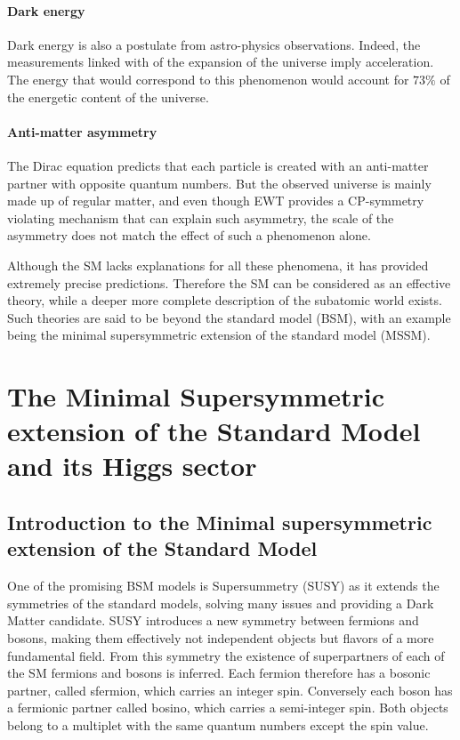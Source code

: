 \paragraph{Dark energy} Dark energy is also a postulate from astro-physics observations. Indeed, the measurements linked with of the expansion of the universe imply acceleration. The energy that would correspond to this phenomenon would account for $73\%$ of the energetic content of the universe. 

\paragraph{Anti-matter asymmetry} The Dirac equation predicts that each particle is created with an anti-matter partner with opposite quantum numbers. But the observed universe is mainly made up of regular matter, and even though EWT provides a CP-symmetry violating mechanism that can explain such asymmetry, the scale of the asymmetry does not match the effect of such a phenomenon alone.\newline

Although the SM lacks explanations for all these phenomena, it has provided extremely precise predictions. Therefore the SM can be considered as an effective theory, while a deeper more complete description of the subatomic world exists. Such theories are said to be beyond the standard model (BSM), with an example being the minimal supersymmetric extension of the standard model (MSSM).


\section{The Minimal Supersymmetric extension of the Standard Model and its Higgs sector}
\label{sec:MSSM}

\subsection{Introduction to the Minimal supersymmetric extension of the Standard Model}

One of the promising BSM models is Supersummetry (SUSY) as it extends the symmetries of the standard models, solving many issues and providing a Dark Matter candidate. SUSY \cite{Martin:1997ns} introduces a new symmetry between fermions and bosons, making them effectively not independent objects but flavors of a more fundamental field. From this symmetry the existence of superpartners of each of the SM fermions and bosons is inferred. Each fermion therefore has a bosonic partner, called sfermion, which carries an integer spin. Conversely each boson has a fermionic partner called bosino, which carries a semi-integer spin. Both objects belong to a multiplet with the same quantum numbers except the spin value.\newline

